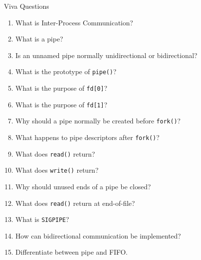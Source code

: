 \documentclass[aspectratio=169]{beamer}
\begin{document}
\begin{frame}{Viva Questions}

\small

\begin{enumerate}

    \item What is Inter-Process Communication?

    \item What is a pipe?

    \item Is an unnamed pipe normally unidirectional or bidirectional?

    \item What is the prototype of \texttt{pipe()}?

    \item What is the purpose of \texttt{fd[0]}?

    \item What is the purpose of \texttt{fd[1]}?

    \item Why should a pipe normally be created before \texttt{fork()}?

    \item What happens to pipe descriptors after \texttt{fork()}?

    \item What does \texttt{read()} return?

    \item What does \texttt{write()} return?

    \item Why should unused ends of a pipe be closed?

    \item What does \texttt{read()} return at end-of-file?

    \item What is \texttt{SIGPIPE}?

    \item How can bidirectional communication be implemented?

    \item Differentiate between pipe and FIFO.

\end{enumerate}

\end{frame}
\end{document}

